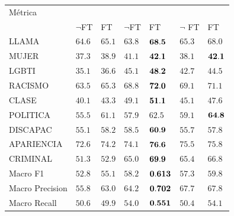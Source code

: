 \begin{table}
    \centering
    \Large
    \begin{tabular}{l P{0.08\textwidth}P{0.08\textwidth} P{0.08\textwidth}P{0.08\textwidth}  P{0.08\textwidth}P{0.08\textwidth}}
        Métrica        &&           &      \\
                       & $\neg$FT&    FT    & $\neg$FT   &    FT     & $\neg$ FT&    FT     \\
        \hline
        LLAMA          & $64.6$ &    $65.1$   & $63.8$ &$\mathbf{68.5}$  & $65.3$ &    $68.0$    \\
        MUJER          & $37.3$ &    $38.9$   & $41.1$ &$\mathbf{42.1}$  & $38.1$ &$\mathbf{42.1}$ \\
        LGBTI          & $35.1$ &    $36.6$   & $45.1$ &$\mathbf{48.2}$  & $42.7$ &    $44.5$    \\
        RACISMO        & $63.5$ &    $65.3$   & $68.8$ &$\mathbf{72.0}$  & $69.1$ &    $71.1$    \\
        CLASE          & $40.1$ &    $43.3$   & $49.1$ &$\mathbf{51.1}$  & $45.1$ &    $47.6$    \\
        POLITICA       & $55.5$ &    $61.1$   & $57.9$ &$62.5$        & $59.1$ &$\mathbf{64.8}$ \\
        DISCAPAC       & $55.1$ &    $58.2$   & $58.5$ &$\mathbf{60.9}$  & $55.7$ &    $57.8$    \\
        APARIENCIA     & $72.6$ &    $74.2$   & $74.1$ &$\mathbf{76.6}$  & $75.5$ &    $75.8$    \\
        CRIMINAL       & $51.3$ &    $52.9$   & $65.0$ &$\mathbf{69.9}$  & $65.4$ &    $66.8$    \\
        \hline
        Macro F1       & $52.8$ &    $55.1$   & $58.2$ &$\mathbf{0.613}$ & $57.3$ &    $59.8$    \\
        Macro Precision& $55.8$ &    $63.0$   & $64.2$ &$\mathbf{0.702}$ & $67.7$ &    $67.8$    \\
        Macro Recall   & $50.6$ &    $49.9$   & $54.0$ &$\mathbf{0.551}$ & $50.4$ &    $54.1$    \\

\end{tabular}
\end{table}
